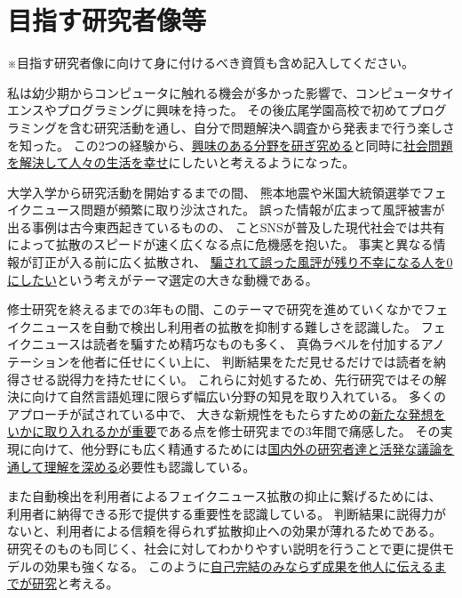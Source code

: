 
\section{目指す研究者像等}

\noindent
{} {\footnotesize ※目指す研究者像に向けて身に付けるべき資質も含め記入してください。}

私は幼少期からコンピュータに触れる機会が多かった影響で、コンピュータサイエンスやプログラミングに興味を持った。
その後広尾学園高校で初めてプログラミングを含む研究活動を通し、自分で問題解決へ調査から発表まで行う楽しさを知った。
この2つの経験から、\underline{興味のある分野を研ぎ究める}と同時に\underline{社会問題を解決して人々の生活を幸せ}にしたいと考えるようになった。

大学入学から研究活動を開始するまでの間、
熊本地震や米国大統領選挙でフェイクニュース問題が頻繁に取り沙汰された。
誤った情報が広まって風評被害が出る事例は古今東西起きているものの、
ことSNSが普及した現代社会では共有によって拡散のスピードが速く広くなる点に危機感を抱いた。
事実と異なる情報が訂正が入る前に広く拡散され、
\underline{騙されて誤った風評が残り不幸になる人を0にしたい}という考えがテーマ選定の大きな動機である。

修士研究を終えるまでの3年もの間、このテーマで研究を進めていくなかでフェイクニュースを自動で検出し利用者の拡散を抑制する難しさを認識した。
フェイクニュースは読者を騙すため精巧なものも多く、
真偽ラベルを付加するアノテーションを他者に任せにくい上に、
判断結果をただ見せるだけでは読者を納得させる説得力を持たせにくい。
これらに対処するため、先行研究ではその解決に向けて自然言語処理に限らず幅広い分野の知見を取り入れている。
多くのアプローチが試されている中で、
大きな新規性をもたらすための\underline{新たな発想をいかに取り入れるかが重要}である点を修士研究までの3年間で痛感した。
その実現に向けて、他分野にも広く精通するためには\underline{国内外の研究者達と活発な議論を通して理解を深める}必要性も認識している。

また自動検出を利用者によるフェイクニュース拡散の抑止に繋げるためには、
利用者に納得できる形で提供する重要性を認識している。
判断結果に説得力がないと、利用者による信頼を得られず拡散抑止への効果が薄れるためである。
研究そのものも同じく、社会に対してわかりやすい説明を行うことで更に提供モデルの効果も強くなる。
このように\underline{自己完結のみならず成果を他人に伝えるまでが研究}と考える。

